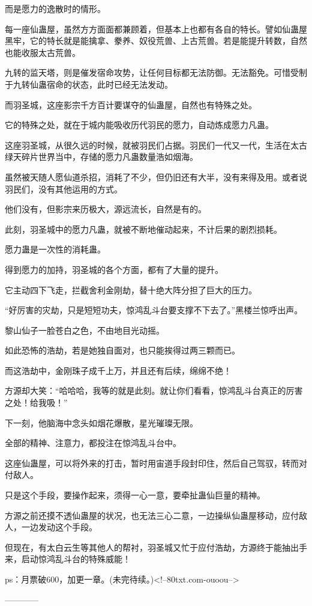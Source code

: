 \begin{this_body}
而是愿力的逸散时的情形。

每一座仙蛊屋，虽然方方面面都兼顾着，但基本上也都有各自的特长。譬如仙蛊屋黑牢，它的特长就是能擒拿、豢养、奴役荒兽、上古荒兽。若是能提升转数，自然也能收服太古荒兽。

九转的监天塔，则是催发宿命攻势，让任何目标都无法防御。无法豁免。可惜受制于九转仙蛊宿命的状态，此时已经无法发动。

而羽圣城，这座影宗千方百计要谋夺的仙蛊屋，自然也有特殊之处。

它的特殊之处，就在于城内能吸收历代羽民的愿力，自动炼成愿力凡蛊。

这座羽圣城，从很久远的时候，就被羽民们占据。羽民们一代又一代，生活在太古绿天碎片世界当中，存储的愿力凡蛊数量浩如烟海。

虽然被天随人愿仙道杀招，消耗了不少，但仍旧还有大半，没有来得及用。或者说羽民们，没有其他运用的方式。

他们没有，但影宗来历极大，源远流长，自然是有的。

此刻，羽圣城中的愿力凡蛊，就被不断地催动起来，不计后果的剧烈损耗。

愿力蛊是一次性的消耗蛊。

得到愿力的加持，羽圣城的各个方面，都有了大量的提升。

它主动四下飞走，拦截舍利金刚劫，替十绝大阵分担了巨大的压力。

“好厉害的灾劫，只是短短功夫，惊鸿乱斗台要支撑不下去了。”黑楼兰惊呼出声。

黎山仙子一脸苍白之色，不由地目光动摇。

如此恐怖的浩劫，若是她独自面对，也只能挨得过两三颗而已。

而这浩劫中，金刚珠子成千上万，并且还有后续，绵绵不绝！

方源却大笑：“哈哈哈，我等的就是此刻。就让你们看看，惊鸿乱斗台真正的厉害之处！给我吸！”

下一刻，他脑海中念头如烟花爆散，星光璀璨无限。

全部的精神、注意力，都投注在惊鸿乱斗台中。

这座仙蛊屋，可以将外来的打击，暂时用宙道手段封印住，然后自己驾驭，转而对付敌人。

只是这个手段，要操作起来，须得一心一意，要牵扯蛊仙巨量的精神。

方源之前还摸不透仙蛊屋的状况，也无法三心二意，一边操纵仙蛊屋移动，应付敌人，一边发动这个手段。

但现在，有太白云生等其他人的帮衬，羽圣城又忙于应付浩劫，方源终于能抽出手来，启动惊鸿乱斗台的特殊威能！

ps：月票破600，加更一章。(未完待续。)<!--80txt.com-ouoou-->

------------

\end{this_body}

